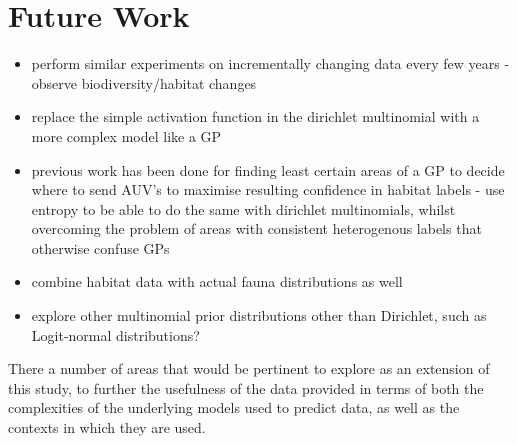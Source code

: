 \section{Future Work}

\begin{itemize}
    \item perform similar experiments on incrementally changing data every few years - observe biodiversity/habitat changes
    \item replace the simple activation function in the dirichlet multinomial with a more complex model like a GP
    \item previous work has been done for finding least certain areas of a GP to decide where to send AUV's to maximise resulting confidence in habitat labels - use entropy to be able to do the same with dirichlet multinomials, whilst overcoming the problem of areas with consistent heterogenous labels that otherwise confuse GPs
    \item combine habitat data with actual fauna distributions as well
    \item explore other multinomial prior distributions other than Dirichlet, such as Logit-normal distributions?
\end{itemize}

There a number of areas that would be pertinent to explore as an extension of this study, to further the usefulness of the data provided in terms of both the complexities of the underlying models used to predict data, as well as the contexts in which they are used.


